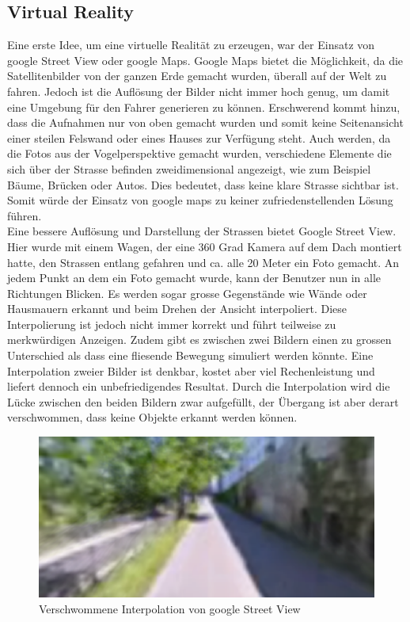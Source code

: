 \subsection{Virtual Reality}
Eine erste Idee, um eine virtuelle Realität zu erzeugen, war der Einsatz von google Street View oder google Maps. Google Maps bietet die Möglichkeit, da die Satellitenbilder von der ganzen Erde gemacht wurden, überall auf der Welt zu fahren. Jedoch ist die Auflösung der Bilder nicht immer hoch genug, um damit eine Umgebung für den Fahrer generieren zu können. Erschwerend kommt hinzu, dass die Aufnahmen nur von oben gemacht wurden und somit keine Seitenansicht einer steilen Felswand oder eines Hauses zur Verfügung steht. Auch werden, da die Fotos aus der Vogelperspektive gemacht wurden, verschiedene Elemente die sich über der Strasse befinden zweidimensional angezeigt, wie zum Beispiel Bäume, Brücken oder Autos. Dies bedeutet, dass keine klare Strasse sichtbar ist. Somit würde der Einsatz von google maps zu keiner zufriedenstellenden Lösung führen. \\
Eine bessere Auflösung und Darstellung der Strassen bietet Google Street View. Hier wurde mit einem Wagen, der eine 360 Grad Kamera auf dem Dach montiert hatte, den Strassen entlang gefahren und ca. alle 20 Meter ein Foto gemacht. An jedem Punkt an dem ein Foto gemacht wurde, kann der Benutzer nun in alle Richtungen Blicken. Es werden sogar grosse Gegenstände wie Wände oder Hausmauern erkannt und beim Drehen der Ansicht interpoliert. Diese Interpolierung ist jedoch nicht immer korrekt und führt teilweise zu merkwürdigen Anzeigen. Zudem gibt es zwischen zwei Bildern einen zu grossen Unterschied als dass eine fliesende Bewegung simuliert werden könnte. Eine Interpolation zweier Bilder ist denkbar, kostet aber viel Rechenleistung und liefert dennoch ein unbefriedigendes Resultat. Durch die Interpolation wird die Lücke zwischen den beiden Bildern zwar aufgefüllt, der Übergang ist aber derart verschwommen, dass keine Objekte erkannt werden können.
\begin{figure}[H]
\centering 
\includegraphics[width=1.0\linewidth]{src/screenshot_google_street_view_unscharf.png}
\caption{Verschwommene Interpolation von google Street View} %
\label{screenshot_google_street_view_unscharf} %
\end{figure}
